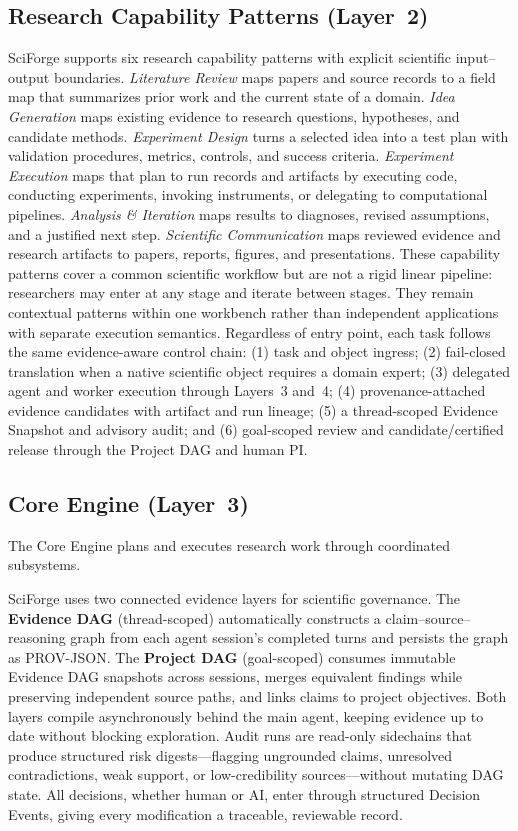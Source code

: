 \documentclass[sn-basic,Numbered,pdflatex]{sn-jnl}
\begin{document}
\subsection{Research Capability Patterns (Layer~2)}
SciForge supports six research capability patterns with explicit scientific input--output boundaries. \emph{Literature Review} maps papers and source records to a field map that summarizes prior work and the current state of a domain. \emph{Idea Generation} maps existing evidence to research questions, hypotheses, and candidate methods. \emph{Experiment Design} turns a selected idea into a test plan with validation procedures, metrics, controls, and success criteria. \emph{Experiment Execution} maps that plan to run records and artifacts by executing code, conducting experiments, invoking instruments, or delegating to computational pipelines. \emph{Analysis \& Iteration} maps results to diagnoses, revised assumptions, and a justified next step. \emph{Scientific Communication} maps reviewed evidence and research artifacts to papers, reports, figures, and presentations. These capability patterns cover a common scientific workflow but are not a rigid linear pipeline: researchers may enter at any stage and iterate between stages. They remain contextual patterns within one workbench rather than independent applications with separate execution semantics. Regardless of entry point, each task follows the same evidence-aware control chain: (1) task and object ingress; (2) fail-closed translation when a native scientific object requires a domain expert; (3) delegated agent and worker execution through Layers~3 and~4; (4) provenance-attached evidence candidates with artifact and run lineage; (5) a thread-scoped Evidence Snapshot and advisory audit; and (6) goal-scoped review and candidate/certified release through the Project DAG and human PI.

\subsection{Core Engine (Layer~3)}
The Core Engine plans and executes research work through coordinated subsystems.

SciForge uses two connected evidence layers for scientific governance. The \textbf{Evidence DAG} (thread-scoped) automatically constructs a claim--source--reasoning graph from each agent session's completed turns and persists the graph as PROV-JSON. The \textbf{Project DAG} (goal-scoped) consumes immutable Evidence DAG snapshots across sessions, merges equivalent findings while preserving independent source paths, and links claims to project objectives. Both layers compile asynchronously behind the main agent, keeping evidence up to date without blocking exploration. Audit runs are read-only sidechains that produce structured risk digests---flagging ungrounded claims, unresolved contradictions, weak support, or low-credibility sources---without mutating DAG state. All decisions, whether human or AI, enter through structured Decision Events, giving every modification a traceable, reviewable record.
\end{document}
